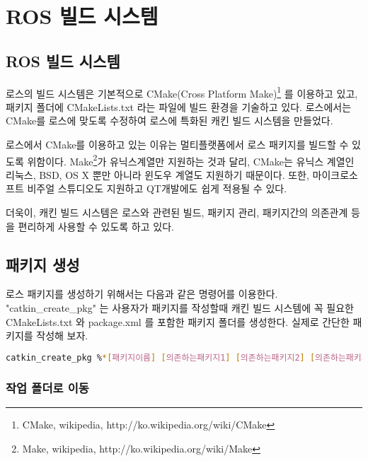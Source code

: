 \section{ROS 빌드 시스템}

\subsection{ROS 빌드 시스템}

로스의 빌드 시스템은 기본적으로 CMake(Cross Platform Make)\footnote{CMake, wikipedia, http://ko.wikipedia.org/wiki/CMake} 를 이용하고 있고, 패키지 폴더에 CMakeLists.txt 라는 파일에 빌드 환경을 기술하고 있다. 로스에서는 CMake를 로스에 맞도록 수정하여 로스에 특화된 캐킨 빌드 시스템을 만들었다. 

로스에서 CMake를 이용하고 있는 이유는 멀티플랫폼에서 로스 패키지를 빌드할 수 있도록 위함이다. Make\footnote{Make, wikipedia, http://ko.wikipedia.org/wiki/Make}가 유닉스계열만 지원하는 것과 달리, CMake는 유닉스 계열인 리눅스, BSD, OS X 뿐만 아니라 윈도우 계열도 지원하기 때문이다. 또한, 마이크로소프트 비주얼 스튜디오도 지원하고 QT개발에도 쉽게 적용될 수 있다. 

더욱이, 캐킨 빌드 시스템은 로스와 관련된 빌드, 패키지 관리, 패키지간의 의존관계 등을 편리하게 사용할 수 있도록 하고 있다. 

\subsection{패키지 생성}

로스 패키지를 생성하기 위해서는 다음과 같은 명령어를 이용한다. "catkin\_create\_pkg" 는 사용자가 패키지를 작성할때 캐킨 빌드 시스템에 꼭 필요한 CMakeLists.txt 와 package.xml 를 포함한 패키지 폴더를 생성한다. 실제로 간단한 패키지를 작성해 보자.

\begin{lstlisting}[language=bash]
catkin_create_pkg %*[패키지이름] [의존하는패키지1] [의존하는패키지2] [의존하는패키지3]*)
\end{lstlisting}

\subsubsection{작업 폴더로 이동}

